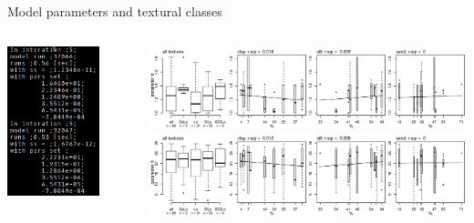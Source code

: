 \begin{block}{Model parameters and textural classes}
\begin{columns}
\begin{column}{0.2\textwidth}
        \centering
        \includegraphics[width = 0.75\textwidth]{obr/cli.png}
    \end{column}
    \begin{column}{0.8\textwidth}
        \includegraphics[width = \textwidth]{obr/bfittex.png}\\
        \includegraphics[width = \textwidth]{obr/Xfittex.png}\\

\end{column}
\end{columns}
\end{block}
